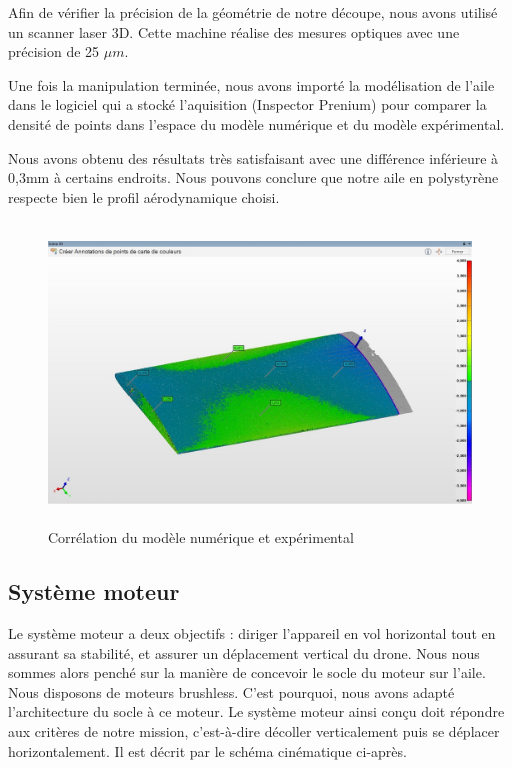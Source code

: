 \documentclass[a4paper,12pt,french]{report}
\begin{document}
    Afin de vérifier la précision de la géométrie de notre découpe, nous avons utilisé un scanner laser 3D. Cette machine réalise des mesures optiques avec une précision de 25 $\mu m$.\newline

Une fois la manipulation terminée, nous avons importé la modélisation de l'aile dans le logiciel qui a stocké l'aquisition (Inspector Prenium) pour comparer la densité de points dans l'espace du modèle numérique et du modèle expérimental.\newline

Nous avons obtenu des résultats très satisfaisant avec une différence inférieure à 0,3mm à certains endroits. Nous pouvons conclure que notre aile en polystyrène respecte bien le profil aérodynamique choisi.

\begin{figure}[h]
    \centering
    \includegraphics[height=8cm]{figures/geo.jpg}
    \caption{Corrélation du modèle numérique et expérimental}
    \label{ailepoly}
\end{figure}

\newpage
\subsection{Système moteur}

Le système moteur a deux objectifs : diriger l'appareil en vol horizontal tout en assurant sa stabilité, et assurer un déplacement vertical du drone. Nous nous sommes alors penché sur la manière de concevoir le socle du moteur sur l’aile. Nous disposons de moteurs brushless. C'est pourquoi, nous avons adapté l’architecture du socle à ce moteur. Le système moteur ainsi conçu doit répondre aux critères de notre mission, c'est-à-dire décoller verticalement puis se déplacer horizontalement. Il est décrit par le schéma cinématique ci-après.\newline
\end{document}
